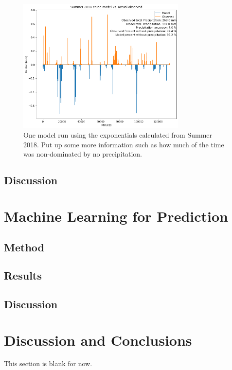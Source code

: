 \documentclass[11pt]{report}
\begin{document}
\clearpage
\begin{figure}[t]
  \centering
  \includegraphics[width=0.75\textwidth]{Figures/run_with_more_info.png}
  \caption[More  run using Summer 2018 climatology]
  {\label{crudesmodel} One model run using the exponentials calculated from
    Summer 2018. Put up some more information such as how much of the time
    was non-dominated by no precipitation.}
\end{figure}

\subsection{Discussion}\label{sec:spc_d}

\clearpage

\section{Machine Learning for Prediction}\label{sec:MLP}






\subsection{Method}

\subsection{Results}

\subsection{Discussion}


\clearpage

\section{Discussion and Conclusions}\label{sec:conclusions}

This section is blank for now. 

\small
\renewcommand{\bibsep}{0em}

\renewcommand{\bibname}{References}


\end{document}
